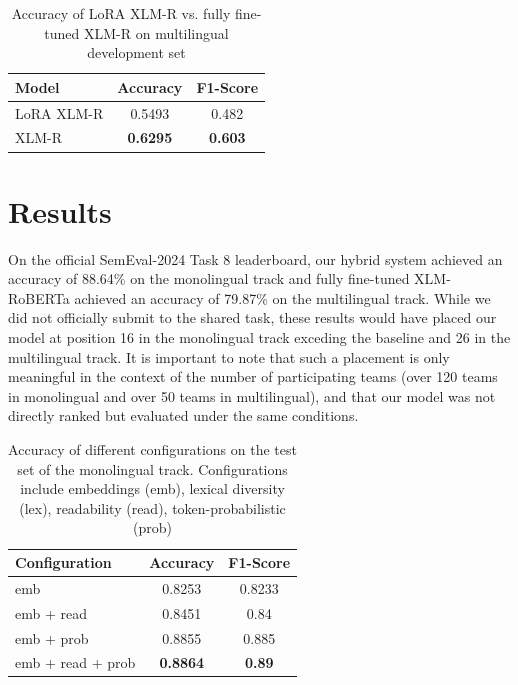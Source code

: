 \documentclass[11pt]{article}
\begin{document}
\begin{table}[ht]
    \centering
    \begin{tabular}{l c c}
    \hline
    \textbf{Model} & \textbf{Accuracy} & \textbf{F1-Score} \\
    \hline
    LoRA XLM-R & 0.5493 & 0.482 \\
    
    XLM-R & \textbf{0.6295} & \textbf{0.603} \\
    \hline
    \end{tabular}
    \caption{Accuracy of LoRA XLM-R vs. fully fine-tuned XLM-R on multilingual development set}
    \label{tab:MultiAccuracy}
\end{table}

\section{Results}
On the official SemEval-2024 Task 8 leaderboard, our hybrid system achieved an accuracy of 88.64\% on the monolingual track and fully fine-tuned XLM-RoBERTa achieved an accuracy of 79.87\% on the multilingual track. 
While we did not officially submit to the shared task, these results would have placed our model at position 16 in the monolingual track exceding the baseline and 26 in the multilingual track. 
It is important to note that such a placement is only meaningful in the context of the number of participating teams (over 120 teams in monolingual and over 50 teams in multilingual), and that our model was not directly ranked but evaluated under the same conditions. 

\begin{table}[ht]
    \centering
    \begin{tabular}{l c c}
    \hline
    \textbf{Configuration} & \textbf{Accuracy} & \textbf{F1-Score} \\
    \hline
    emb & 0.8253 & 0.8233 \\
    
    emb + read & 0.8451 & 0.84 \\
    
    emb + prob & 0.8855 & 0.885 \\
    
    emb + read + prob & \textbf{0.8864} & \textbf{0.89}  \\ 

    \hline
    \end{tabular}
    \caption{Accuracy of different configurations on the test set of the monolingual track.
    Configurations include embeddings (emb), lexical diversity (lex), readability (read), token-probabilistic (prob)}
    \label{tab:Accuracy}
\end{table}
\end{document}
